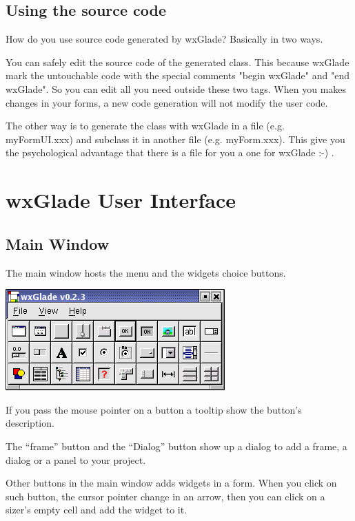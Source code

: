 \documentclass[a4paper,10pt]{report}
\begin{document}
\section{Using the source code}

How do you use source code generated by wxGlade? Basically in two ways.

You can safely edit the source code of the generated class. This because
wxGlade mark the untouchable code with the special comments "begin wxGlade" and "end wxGlade".
So you can edit all you need outside these two tags. When you makes 
changes in your forms, a new code generation will not modify the user code.

The other way is to generate the class with wxGlade in a file (e.g. myFormUI.xxx) and 
subclass it in another file (e.g. myForm.xxx). This give you the psychological advantage
that there is a file for you a one for wxGlade :-) .

\chapter{wxGlade User Interface}

\section{Main Window}

The main window hosts the menu and the widgets choice buttons.

\includegraphics{manual_main.png}

If you pass the mouse pointer on a button a tooltip show the button's 
description.

The ``frame'' button and the ``Dialog'' button show up a dialog
to add a frame, a dialog or a panel to your project.

Other buttons in the main window adds widgets in a form. 
When you click on such button, 
the cursor pointer change in an arrow, then you can click on
a sizer's empty cell and add the widget to it.
 

 
\end{document}
